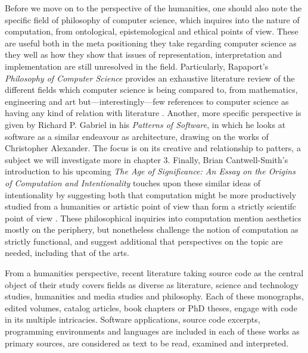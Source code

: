 Before we move on to the perspective of the humanities, one should also note the specific field of philosophy of computer science, which inquires into the nature of computation, from ontological, epistemological and ethical points of view. These are useful both in the meta positioning they take regarding computer science as they well as how they show that issues of representation, interpretation and implementation are still unresolved in the field. Particularly, Rapaport's \emph{Philosophy of Computer Science} provides an exhaustive literature review of the different fields which computer science is being compared to, from mathematics, engineering and art but—interestingly—few references to computer science as having any kind of relation with literature \citep{rapaport_philosophy_2005}. Another, more specific perspective is given by Richard P. Gabriel in his \emph{Patterns of Software}, in which he looks at software as a similar endeavour as architecture, drawing on the works of Christopher Alexander. The focus is on its creative and relationship to patters, a subject we will investigate more in chapter 3. Finally, Brian Cantwell-Smith's introduction to his upcoming \emph{The Age of Significance: An Essay on the Origins of Computation and Intentionality} touches upon these similar ideas of intentionality by suggesting both that computation might be more productively studied from a humanities or artistic point of view than form a strictly scientifc point of view \citep{smith_origin_1998}. These philosophical inquiries into computation mention aesthetics mostly on the periphery, but nonetheless challenge the notion of computation as strictly functional, and suggest additional that perspectives on the topic are needed, including that of the arts.

\vspace{1\baselineskip}

From a humanities perspective, recent literature taking source code as the central object of their study covers fields as diverse as literature, science and technology studies, humanities and media studies and philosophy. Each of these monographs, edited volumes, catalog articles, book chapters or PhD theses, engage with code in its multiple intricacies. Software applications, source code excerpts, programming environments and languages are included in each of these works as primary sources, are considered as text to be read, examined and interpreted.

